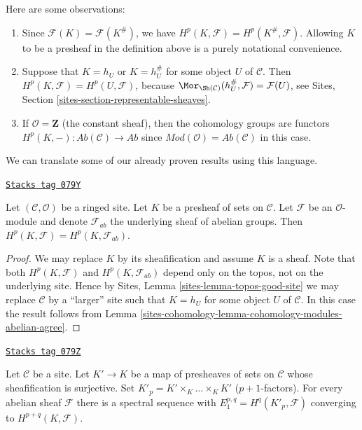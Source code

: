 \medskip\noindent
Here are some observations:
\begin{enumerate}
\item Since $\mathcal{F}(K) = \mathcal{F}(K^\#)$, we have
$H^p(K, \mathcal{F}) = H^p(K^\#, \mathcal{F})$.
Allowing $K$ to be a presheaf in the definition above is
a purely notational convenience.
\item Suppose that $K = h_U$ or $K = h_U^\#$ for some object $U$
of $\mathcal{C}$. Then $H^p(K, \mathcal{F}) = H^p(U, \mathcal{F})$, because
$\Mor_{\Sh(\mathcal{C})}(h_U^\#, \mathcal{F}) = \mathcal{F}(U)$, see
Sites, Section \ref{sites-section-representable-sheaves}.
\item If $\mathcal{O} = \mathbf{Z}$ (the constant sheaf), then
the cohomology groups are functors
$H^p(K, - ) : \textit{Ab}(\mathcal{C}) \to \textit{Ab}$
since $\textit{Mod}(\mathcal{O}) = \textit{Ab}(\mathcal{C})$ in this case.
\end{enumerate}
We can translate some of our already proven results using this language.

\begin{lemma}
\label{sites-cohomology-lemma-compute-cohomology-on-sheaf-sets}
\href{https://stacks.math.columbia.edu/tag/079Y}{\texttt{Stacks tag 079Y}}

Let $(\mathcal{C}, \mathcal{O})$ be a ringed site.
Let $K$ be a presheaf of sets on $\mathcal{C}$.
Let $\mathcal{F}$ be an $\mathcal{O}$-module and denote
$\mathcal{F}_{ab}$ the underlying sheaf of abelian groups.
Then $H^p(K, \mathcal{F}) = H^p(K, \mathcal{F}_{ab})$.
\end{lemma}

\begin{proof}
We may replace $K$ by its sheafification and assume $K$ is a sheaf.
Note that both $H^p(K, \mathcal{F})$ and $H^p(K, \mathcal{F}_{ab})$
depend only on the topos, not on the underlying site. Hence by
Sites, Lemma \ref{sites-lemma-topos-good-site}
we may replace $\mathcal{C}$ by a ``larger'' site such
that $K = h_U$ for some object $U$ of $\mathcal{C}$.
In this case the result follows from
Lemma \ref{sites-cohomology-lemma-cohomology-modules-abelian-agree}.
\end{proof}

\begin{lemma}
\label{sites-cohomology-lemma-cech-to-cohomology-sheaf-sets}
\href{https://stacks.math.columbia.edu/tag/079Z}{\texttt{Stacks tag 079Z}}

Let $\mathcal{C}$ be a site. Let $K' \to K$ be a map of presheaves
of sets on $\mathcal{C}$ whose sheafification is surjective. Set
$K'_p = K' \times_K \ldots \times_K K'$ ($p + 1$-factors).
For every abelian sheaf $\mathcal{F}$ there is a spectral sequence
with $E_1^{p, q} = H^q(K'_p, \mathcal{F})$ converging to
$H^{p + q}(K, \mathcal{F})$.
\end{lemma}

